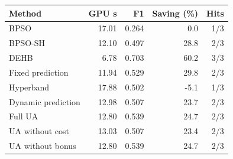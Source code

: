 \begin{tabular}{lrrrr}\toprule
Method & GPU s & F1 & Saving (\%) & Hits\\\midrule
BPSO & 17.01 & 0.264 & 0.0 & 1/3\\
BPSO-SH & 12.10 & 0.497 & 28.8 & 2/3\\
DEHB & 6.78 & 0.703 & 60.2 & 3/3\\
Fixed prediction & 11.94 & 0.529 & 29.8 & 2/3\\
Hyperband & 17.88 & 0.502 & -5.1 & 1/3\\
Dynamic prediction & 12.98 & 0.507 & 23.7 & 2/3\\
Full UA & 12.80 & 0.539 & 24.7 & 2/3\\
UA without cost & 13.03 & 0.507 & 23.4 & 2/3\\
UA without bonus & 12.80 & 0.539 & 24.7 & 2/3\\
\bottomrule\end{tabular}
